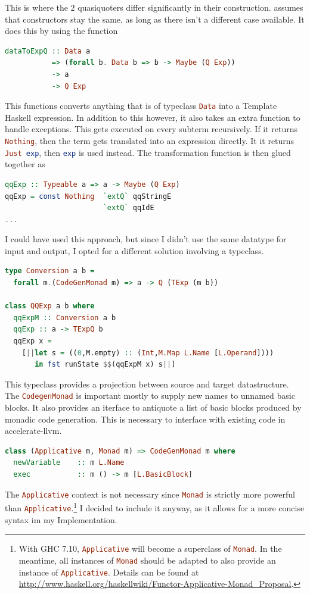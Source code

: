 \documentclass[a4paper,bibliography=totocnumbered,parskip,headsepline]{scrbook}
\begin{document}
This is where the 2 quasiquoters differ significantly in their construction.
 assumes that constructors stay the same, as long as there isn't a different case available.
It does this by using the function
\begin{lstlisting}[language=haskell]
dataToExpQ :: Data a
           => (forall b. Data b => b -> Maybe (Q Exp))
           -> a
           -> Q Exp
\end{lstlisting}
This functions converts anything that is of typeclass \lstinline[language=haskell]!Data! into a Template Haskell expression.
In addition to this however, it also takes an extra function to handle exceptions.
This gets executed on every subterm recursively.
If it returns \lstinline[language=haskell]!Nothing!, then the term gets translated into an expression directly.
It it returns \lstinline[language=haskell]!Just exp!, then \lstinline[language=haskell]!exp! is used instead.
The transformation function is then glued together as
\begin{lstlisting}[language=haskell]
qqExp :: Typeable a => a -> Maybe (Q Exp)
qqExp = const Nothing  `extQ` qqStringE
                       `extQ` qqIdE
...
\end{lstlisting}
I could have used this approach, but since I didn't use the same datatype for input and output, I opted for a different solution involving a typeclass.
\begin{lstlisting}[language=haskell]
type Conversion a b =
  forall m.(CodeGenMonad m) => a -> Q (TExp (m b))

class QQExp a b where
  qqExpM :: Conversion a b
  qqExp :: a -> TExpQ b
  qqExp x =
    [||let s = ((0,M.empty) :: (Int,M.Map L.Name [L.Operand])))
       in fst runState $$(qqExpM x) s||]
\end{lstlisting}
This typeclass provides a projection between source and target datastructure.
The \lstinline[language=haskell]!CodegenMonad! is important mostly to supply new names to unnamed basic blocks.
It also provides an iterface to antiquote a list of basic blocks produced by monadic code generation.
This is necessary to interface with existing code in accelerate-llvm.
\begin{lstlisting}[language=haskell]
class (Applicative m, Monad m) => CodeGenMonad m where
  newVariable    :: m L.Name
  exec           :: m () -> m [L.BasicBlock]
\end{lstlisting}
The \lstinline[language=haskell]!Applicative! context is not necessary since \lstinline[language=haskell]!Monad! is strictly more powerful than \lstinline[language=haskell]!Applicative!.\footnote{With GHC 7.10, \lstinline[language=haskell]!Applicative! will become a superclass of \lstinline[language=haskell]!Monad!.
In the meantime, all instances of \lstinline[language=haskell]!Monad! should be adapted to also provide an instance of \lstinline[language=haskell]!Applicative!.
Details can be found at \url{http://www.haskell.org/haskellwiki/Functor-Applicative-Monad_Proposal}.}
I decided to include it anyway, as it allows for a more concise syntax im my Implementation.
\end{document}
